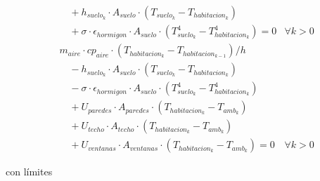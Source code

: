 \begin{align}
	                        & \quad + h_{suelo_k} \cdot A_{suelo} \cdot (T_{suelo_k} - T_{habitacion_k})                             \nonumber                  \\
	                        & \quad + \sigma \cdot \epsilon_{hormigon} \cdot A_{suelo} \cdot (T_{suelo_k}^4 - T_{habitacion_k}^4) = 0           & \forall k > 0 \\
	                        & m_{aire} \cdot cp_{aire} \cdot ( T_{habitacion_k} - T_{habitacion_{k-1}}) / h  \nonumber                                          \\
	                        & \quad - h_{suelo_k} \cdot A_{suelo} \cdot (T_{suelo_k} - T_{habitacion_k})  \nonumber                                             \\
	                        & \quad - \sigma \cdot \epsilon_{hormigon} \cdot A_{suelo} \cdot (T_{suelo_k}^4 - T_{habitacion_k}^4)  \nonumber                    \\
	                        & \quad + U_{paredes} \cdot A_{paredes} \cdot (T_{habitacion_k} - T_{amb_k}) \nonumber                                              \\
	                        & \quad + U_{techo} \cdot A_{techo} \cdot (T_{habitacion_k} - T_{amb_k}) \nonumber                                                  \\
	                        & \quad + U_{ventanas} \cdot A_{ventanas} \cdot (T_{habitacion_k} - T_{amb_k}) = 0                                  & \forall k > 0
\end{align}

con límites

